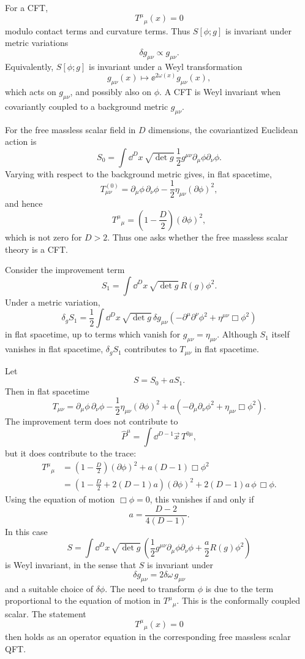 For a CFT,
\[
  T^\mu{}_\mu(x)=0
\]
modulo contact terms and curvature terms.  Thus \(S[\phi;g]\) is
invariant under metric variations
\[
  \delta g_{\mu\nu}\propto g_{\mu\nu}.
\]
Equivalently, \(S[\phi;g]\) is invariant under a Weyl transformation
\[
  g_{\mu\nu}(x)\mapsto \ee^{2\omega(x)}g_{\mu\nu}(x),
\]
which acts on \(g_{\mu\nu}\), and possibly also on \(\phi\).  A CFT is
Weyl invariant when covariantly coupled to a background metric
\(g_{\mu\nu}\).

For the free massless scalar field in \(D\) dimensions, the
covariantized Euclidean action is
\[
  S_0=\int \dd^D x\,\sqrt{\det g}\,
  \frac12 g^{\mu\nu}\partial_\mu\phi\partial_\nu\phi.
\]
Varying with respect to the background metric gives, in flat spacetime,
\[
  T_{\mu\nu}^{(0)}
  =
  \partial_\mu\phi\,\partial_\nu\phi
  -\frac12\eta_{\mu\nu}(\partial\phi)^2,
\]
and hence
\[
  T^\mu{}_\mu
  =
  \left(1-\frac D2\right)(\partial\phi)^2,
\]
which is not zero for \(D>2\).  Thus one asks whether the free massless
scalar theory is a CFT.

Consider the improvement term
\[
  S_1=\int \dd^D x\,\sqrt{\det g}\,R(g)\phi^2 .
\]
Under a metric variation,
\[
  \delta_g S_1
  =
  \frac12\int \dd^D x\,\sqrt{\det g}\,\delta g_{\mu\nu}
  \left(-\partial^\mu\partial^\nu\phi^2
  +\eta^{\mu\nu}\Box\phi^2\right)
\]
in flat spacetime, up to terms which vanish for \(g_{\mu\nu}=\eta_{\mu\nu}\).
Although \(S_1\) itself vanishes in flat spacetime, \(\delta_g S_1\)
contributes to \(T_{\mu\nu}\) in flat spacetime.

Let
\[
  S=S_0+aS_1 .
\]
Then in flat spacetime
\[
  T_{\mu\nu}
  =
  \partial_\mu\phi\,\partial_\nu\phi
  -\frac12\eta_{\mu\nu}(\partial\phi)^2
  +a\left(-\partial_\mu\partial_\nu\phi^2+\eta_{\mu\nu}\Box\phi^2\right).
\]
The improvement term does not contribute to
\[
  \widehat P^\mu=\int \dd^{D-1}\vec x\,T^{0\mu},
\]
but it does contribute to the trace:
\[
\begin{aligned}
  T^\mu{}_\mu
  &=
  \left(1-\frac D2\right)(\partial\phi)^2
  +a(D-1)\Box\phi^2
\\
  &=
  \left(1-\frac D2+2(D-1)a\right)(\partial\phi)^2
  +2(D-1)a\,\phi\,\Box\phi.
\end{aligned}
\]
Using the equation of motion \(\Box\phi=0\), this vanishes if and only if
\[
  a=\frac{D-2}{4(D-1)}.
\]
In this case
\[
  S=
  \int \dd^D x\,\sqrt{\det g}\,
  \left(
    \frac12 g^{\mu\nu}\partial_\mu\phi\partial_\nu\phi
    +\frac{a}{2}R(g)\phi^2
  \right)
\]
is Weyl invariant, in the sense that \(S\) is invariant under
\[
  \delta g_{\mu\nu}=2\delta\omega\,g_{\mu\nu}
\]
and a suitable choice of \(\delta\phi\).  The need to transform
\(\phi\) is due to the term proportional to the equation of motion in
\(T^\mu{}_\mu\).  This is the conformally coupled scalar.  The statement
\[
  T^\mu{}_\mu(x)=0
\]
then holds as an operator equation in the corresponding free massless
scalar QFT.

